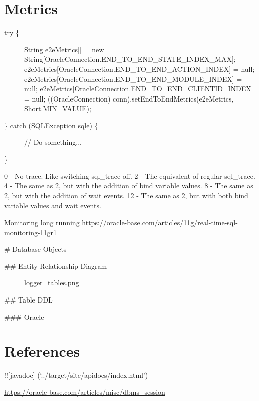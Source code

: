 \documentclass[letterpaper,10pt,english]{sphinxmanual}
\begin{document}
\section{Metrics}
\label{index:metrics}\begin{description}
\item[{try \{}] \leavevmode
String e2eMetrics{[}{]} = new
String{[}OracleConnection.END\_TO\_END\_STATE\_INDEX\_MAX{]};
e2eMetrics{[}OracleConnection.END\_TO\_END\_ACTION\_INDEX{]} = null;
e2eMetrics{[}OracleConnection.END\_TO\_END\_MODULE\_INDEX{]} = null;
e2eMetrics{[}OracleConnection.END\_TO\_END\_CLIENTID\_INDEX{]} = null;
((OracleConnection) conn).setEndToEndMetrics(e2eMetrics,
Short.MIN\_VALUE);

\item[{\} catch (SQLException sqle) \{}] \leavevmode
// Do something...

\end{description}

\}

0 - No trace. Like switching sql\_trace off. 2 - The equivalent of
regular sql\_trace. 4 - The same as 2, but with the addition of bind
variable values. 8 - The same as 2, but with the addition of wait
events. 12 - The same as 2, but with both bind variable values and wait
events.

Monitoring long running
\href{https://oracle-base.com/articles/11g/real-time-sql-monitoring-11gr1}{https://oracle-base.com/articles/11g/real-time-sql-monitoring-11gr1}

\# Database Objects
\begin{description}
\item[{\#\# Entity Relationship Diagram}] \leavevmode
logger\_tables.png

\end{description}

\#\# Table DDL

\#\#\# Oracle


\section{References}
\label{index:references}
!!{[}javadoc{]} (`../target/site/apidocs/index.html')

\href{https://oracle-base.com/articles/misc/dbms\_session}{https://oracle-base.com/articles/misc/dbms\_session}
\end{document}
